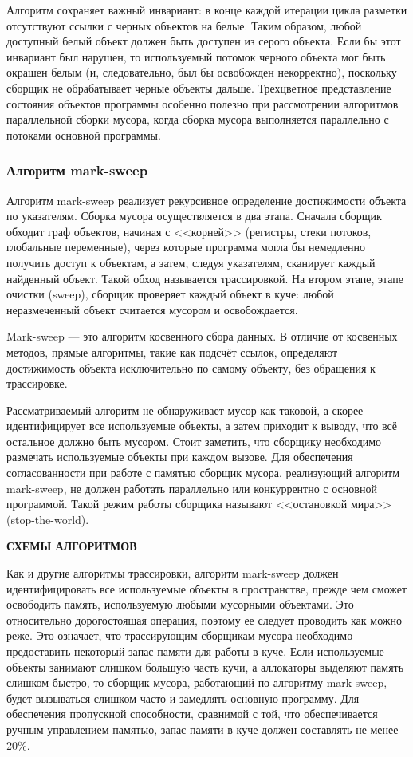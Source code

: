 Алгоритм сохраняет важный инвариант: в конце каждой итерации цикла разметки отсутствуют ссылки с черных объектов на белые. Таким образом, любой доступный белый объект должен быть доступен из серого объекта. Если бы этот инвариант был нарушен, то используемый потомок черного объекта мог быть окрашен белым (и, следовательно, был бы освобожден некорректно), поскольку сборщик не обрабатывает черные объекты дальше. Трехцветное представление состояния объектов программы особенно полезно при рассмотрении алгоритмов параллельной сборки мусора, когда сборка мусора выполняется параллельно с потоками основной программы. \cite{handbook}



\subsubsection{Алгоритм mark-sweep}

Алгоритм mark-sweep реализует рекурсивное определение достижимости объекта по указателям. Сборка мусора осуществляется в два этапа. Сначала сборщик обходит граф объектов, начиная с <<корней>> (регистры, стеки потоков, глобальные переменные), через которые программа могла бы немедленно получить доступ к объектам, а затем, следуя указателям, сканирует каждый найденный объект. Такой обход называется трассировкой. На втором этапе, этапе очистки (sweep), сборщик проверяет каждый объект в куче: любой неразмеченный объект считается мусором и освобождается. \cite{handbook}

Mark-sweep --- это алгоритм косвенного сбора данных. В отличие от косвенных методов, прямые алгоритмы, такие как подсчёт ссылок, определяют достижимость объекта исключительно по самому объекту, без обращения к трассировке.  \cite{handbook}

Рассматриваемый алгоритм не обнаруживает мусор как таковой, а скорее идентифицирует все используемые объекты, а затем приходит к выводу, что всё остальное должно быть мусором. Стоит заметить, что сборщику необходимо размечать используемые объекты при каждом вызове. Для обеспечения согласованности при работе с памятью сборщик мусора, реализующий алгоритм mark-sweep, не должен работать параллельно или конкуррентно с основной программой. Такой режим работы сборщика называют <<остановкой мира>> (stop-the-world). \cite{handbook}

\textbf{СХЕМЫ АЛГОРИТМОВ}

Как и другие алгоритмы трассировки, алгоритм mark-sweep должен идентифицировать все используемые объекты в пространстве, прежде чем сможет освободить память, используемую любыми мусорными объектами. Это относительно дорогостоящая операция, поэтому ее следует проводить как можно реже. Это означает, что трассирующим сборщикам мусора необходимо предоставить некоторый запас памяти для работы в куче. Если используемые объекты занимают слишком большую часть кучи, а аллокаторы выделяют память слишком быстро, то сборщик мусора, работающий по алгоритму mark-sweep, будет вызываться слишком часто и замедлять основную программу. Для обеспечения пропускной способности, сравнимой с той, что обеспечивается ручным управлением памятью, запас памяти в куче должен составлять не менее 20\%. \cite{handbook}

